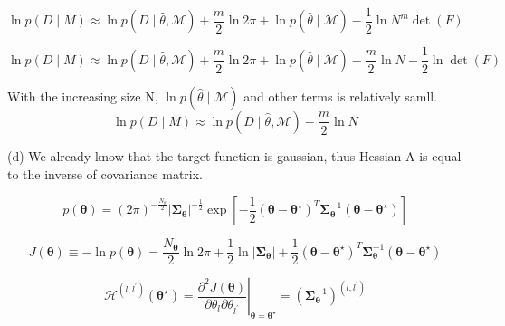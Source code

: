 \documentclass[11pt]{article}
\begin{document}
\begin{enumerate}
\begin{equation}
    \ln p(D \mid M) \approx \ln p(D \mid \hat{\theta}, \mathcal{M})+\frac{m}{2} \ln 2 \pi+\ln p(\hat{\theta} \mid \mathcal{M})-\frac{1}{2} \ln N^ m \operatorname{det}(F)
\end{equation}

\begin{equation}
    \ln p(D \mid M) \approx \ln p(D \mid \hat{\theta}, \mathcal{M})+\frac{m}{2} \ln 2 \pi+\ln p(\hat{\theta} \mid \mathcal{M}) -\frac{m}{2} \ln N - \frac{1}{2} \ln  \operatorname{det}(F)
\end{equation}

With the increasing size N,
$\ln p(\hat{\theta} \mid \mathcal{M})$ and other terms is relatively samll.
\begin{equation}
    \ln p(D \mid M) \approx \ln p(D \mid \hat{\theta}, \mathcal{M})-\frac{m}{2} \ln N 
\end{equation}




(d)
We already know that the target function is gaussian, thus Hessian A is equal to the inverse of covariance matrix.

\begin{equation}
    p(\boldsymbol{\theta})=(2 \pi)^{-\frac{N_{\theta}}{2}}\left|\boldsymbol{\Sigma}_{\boldsymbol{\theta}}\right|^{-\frac{1}{2}} \exp \left[-\frac{1}{2}\left(\boldsymbol{\theta}-\boldsymbol{\theta}^{\star}\right)^{T} \boldsymbol{\Sigma}_{\boldsymbol{\theta}}^{-1}\left(\boldsymbol{\theta}-\boldsymbol{\theta}^{\star}\right)\right]
\end{equation}

\begin{equation}
    J(\boldsymbol{\theta}) \equiv-\ln p(\boldsymbol{\theta})=\frac{N_{\boldsymbol{\theta}}}{2} \ln 2 \pi+\frac{1}{2} \ln \left|\boldsymbol{\Sigma}_{\boldsymbol{\theta}}\right|+\frac{1}{2}\left(\boldsymbol{\theta}-\boldsymbol{\theta}^{\star}\right)^{T} \boldsymbol{\Sigma}_{\boldsymbol{\theta}}^{-1}\left(\boldsymbol{\theta}-\boldsymbol{\theta}^{\star}\right)
\end{equation}

\begin{equation}
    \mathcal{H}^{\left(l, l^{\prime}\right)}\left(\boldsymbol{\theta}^{\star}\right)=\left.\frac{\partial^{2} J(\boldsymbol{\theta})}{\partial \theta_{l} \partial \theta_{l^{\prime}}}\right|_{\boldsymbol{\theta}=\boldsymbol{\theta}^{\star}}=\left(\boldsymbol{\Sigma}_{\boldsymbol{\theta}}^{-1}\right)^{\left(l, l^{\prime}\right)}
\end{equation}




\end{enumerate}
\end{document}
